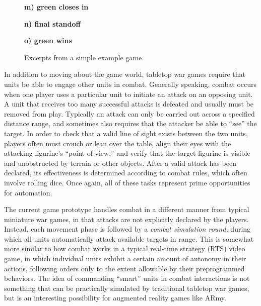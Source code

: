 \documentclass{thesis}
\begin{document}
\begin{figure}[p]
 \begin{minipage}{\picwidth}\textcolor[rgb]{0,0,0}{\hspace{0.02in} {\bf m) green closes in}} \end{minipage}
 \begin{minipage}{\picwidth}\textcolor[rgb]{0,0,0}{\hspace{0.02in} {\bf n) final standoff}} \end{minipage}
 \begin{minipage}{\picwidth}\textcolor[rgb]{0,0,0}{\hspace{0.02in} {\bf o) green wins}} \end{minipage}

%
\caption[Sample ARmy Game]{Excerpts from a simple example game.}
\label{FIGURE:CombatMovementExample}
\vspace{-0.15in}
\end{figure}



In addition to moving about the game world, tabletop war games require that units be able to engage other units in combat. Generally speaking, combat occurs when one player uses a particular unit to initiate an attack on an opposing unit. A unit that receives too many successful attacks is defeated and usually must be removed from play. Typically an attack can only be carried out across a specified distance range, and sometimes also requires that the attacker be able to ``see'' the target. In order to check that a valid line of sight exists between the two units, players often must crouch or lean over the table, align their eyes with the attacking figurine's ``point of view,'' and verify that the target figurine is visible and unobstructed by terrain or other objects. After a valid attack has been declared, its effectiveness is determined according to combat rules, which often involve rolling dice. Once again, all of these tasks represent prime opportunities for automation.

The current game prototype handles combat in a different manner from typical miniature war games, in that attacks are not explicitly declared by the players. Instead, each movement phase is followed by a \emph{combat simulation round,} during which all units automatically attack available targets in range. This is somewhat more similar to how combat works in a typical real-time strategy (RTS) video game, in which individual units exhibit a certain amount of autonomy in their actions, following orders only to the extent allowable by their preprogrammed behaviors. The idea of commanding ``smart'' units in combat interactions is not something that can be practically simulated by traditional tabletop war games, but is an interesting possibility for augmented reality games like ARmy. 
\end{document}
